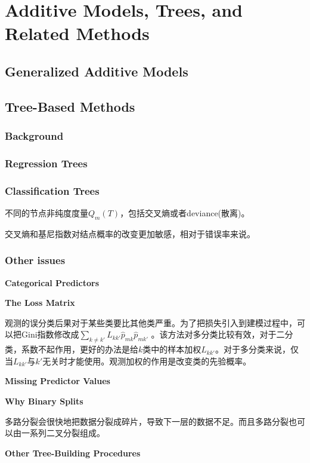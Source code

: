 \chapter{Additive Models, Trees, and Related Methods}
    \section{Generalized Additive Models}
    \section{Tree-Based Methods}
        \subsection{Background}
        \subsection{Regression Trees}
        \subsection{Classification Trees}
            不同的节点非纯度度量${Q_m}(T)$，包括交叉熵或者deviance(散离)。

            交叉熵和基尼指数对结点概率的改变更加敏感，相对于错误率来说。
        \subsection{Other issues}
            {\color{blue} \bf{Categorical Predictors}}

            {\color{blue} \bf{The Loss Matrix}}

            观测的误分类后果对于某些类要比其他类严重。为了把损失引入到建模过程中，可以把Gini指数修改成$\sum\nolimits_{k \ne k'} {{L_{kk'}}} {\hat p_{mk}}{\hat p_{mk'}}$ 。该方法对多分类比较有效，对于二分类，系数不起作用，更好的办法是给$k$类中的样本加权$L_{kk'}$。对于多分类来说，仅当$L_{kk'}$与$k'$无关时才能使用。观测加权的作用是改变类的先验概率。

            {\color{blue} \bf{Missing Predictor Values}}

            {\color{blue} \bf{Why Binary Splits}}

            多路分裂会很快地把数据分裂成碎片，导致下一层的数据不足。而且多路分裂也可以由一系列二叉分裂组成。

            {\color{blue} \bf{Other Tree-Building Procedures}}

